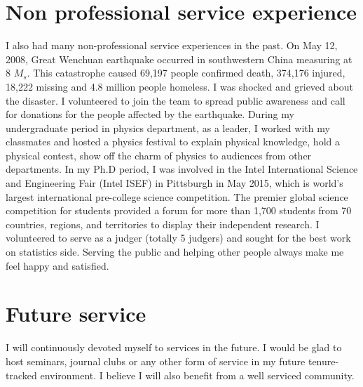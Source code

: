 \documentclass[12pt]{amsart} \usepackage{amssymb}
\begin{document}
\section{Non professional service experience}
I also had many non-professional service experiences in the past.
On May 12, 2008,
Great Wenchuan earthquake occurred in southwestern China measuring at 8 $M_s$.
This catastrophe caused 69,197 people  confirmed death, 374,176 injured, 18,222 missing and 4.8 million people homeless.
I was shocked and grieved about the disaster.
I volunteered to join the team to spread public awareness  and call for donations for the people affected by the earthquake.
During my undergraduate period in physics department,  as a leader, I worked with my classmates and hosted a physics festival to explain physical knowledge, 
hold a physical contest, show off the charm of physics to audiences from other departments. 
In my Ph.D period, I was involved in the Intel International Science and Engineering Fair
(Intel ISEF) in Pittsburgh in May 2015, which is world's largest international pre-college
science competition. The premier global science competition for students provided a forum
for more than 1,700 students from 70 countries, regions, and territories to display their
independent research. I volunteered to serve as a judger (totally 5 judgers) and sought for the best work on statistics side.
Serving the public and helping other people always make me feel happy and satisfied.


\section{Future service}
I will continuously devoted myself to services in the future.
I would be glad to host seminars, journal clubs or any other form of service in my future tenure-tracked environment.
I believe I will also benefit from a well serviced community.
 
\end{document}
